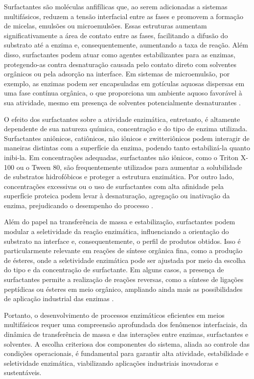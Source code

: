 \documentclass[12pt,oneside]{report}
\begin{document}
Surfactantes são moléculas anfifílicas que, ao serem adicionadas a sistemas multifásicos, reduzem a tensão interfacial entre as fases e promovem a formação de micelas, emulsões ou microemulsões. Essas estruturas aumentam significativamente a área de contato entre as fases, facilitando a difusão do substrato até a enzima e, consequentemente, aumentando a taxa de reação. Além disso, surfactantes podem atuar como agentes estabilizantes para as enzimas, protegendo-as contra desnaturação causada pelo contato direto com solventes orgânicos ou pela adsorção na interface. Em sistemas de microemulsão, por exemplo, as enzimas podem ser encapsuladas em gotículas aquosas dispersas em uma fase contínua orgânica, o que proporciona um ambiente aquoso favorável à sua atividade, mesmo em presença de solventes potencialmente desnaturantes \cite{lau2010surfactants}.

O efeito dos surfactantes sobre a atividade enzimática, entretanto, é altamente dependente de sua natureza química, concentração e do tipo de enzima utilizada. Surfactantes aniônicos, catiônicos, não iônicos e zwitteriônicos podem interagir de maneiras distintas com a superfície da enzima, podendo tanto estabilizá-la quanto inibi-la. Em concentrações adequadas, surfactantes não iônicos, como o Triton X-100 ou o Tween 80, são frequentemente utilizados para aumentar a solubilidade de substratos hidrofóbicos e proteger a estrutura enzimática. Por outro lado, concentrações excessivas ou o uso de surfactantes com alta afinidade pela superfície proteica podem levar à desnaturação, agregação ou inativação da enzima, prejudicando o desempenho do processo \cite{lau2010surfactants}.

Além do papel na transferência de massa e estabilização, surfactantes podem modular a seletividade da reação enzimática, influenciando a orientação do substrato na interface e, consequentemente, o perfil de produtos obtidos. Isso é particularmente relevante em reações de síntese orgânica fina, como a produção de ésteres, onde a seletividade enzimática pode ser ajustada por meio da escolha do tipo e da concentração de surfactante. Em alguns casos, a presença de surfactantes permite a realização de reações reversas, como a síntese de ligações peptídicas ou ésteres em meio orgânico, ampliando ainda mais as possibilidades de aplicação industrial das enzimas \cite{lau2010surfactants}.

Portanto, o desenvolvimento de processos enzimáticos eficientes em meios multifásicos requer uma compreensão aprofundada dos fenômenos interfaciais, da dinâmica de transferência de massa e das interações entre enzimas, surfactantes e solventes. A escolha criteriosa dos componentes do sistema, aliada ao controle das condições operacionais, é fundamental para garantir alta atividade, estabilidade e seletividade enzimática, viabilizando aplicações industriais inovadoras e sustentáveis.
\end{document}
